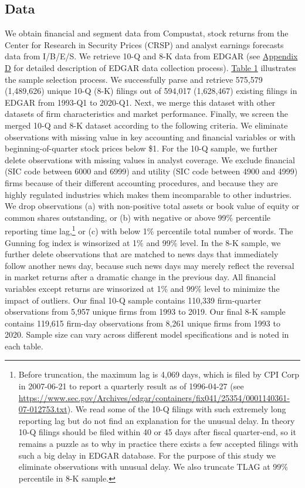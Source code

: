 \documentclass[letterpaper,12pt]{article}
\begin{document}
\begin{spacing}{1.5}
\subsection{Data}
\noindent We obtain financial and segment data from Compustat, stock returns from the Center for Research in Security Prices (CRSP) and analyst earnings forecasts data from I/B/E/S. We retrieve 10-Q and 8-K data from EDGAR (see \hyperref[appd]{Appendix D} for detailed description of EDGAR data collection process). \hyperref[T1]{Table 1} illustrates the sample selection process. We successfully parse and retrieve 575,579 (1,489,626) unique 10-Q (8-K) filings out of 594,017 (1,628,467) existing filings in EDGAR from 1993-Q1 to 2020-Q1. Next, we merge this dataset with other datasets of firm characteristics and market performance. Finally, we screen the merged 10-Q and 8-K dataset according to the following criteria. We eliminate observations with missing value in key accounting and financial variables or with beginning-of-quarter stock prices below \$1. For the 10-Q sample, we further delete observations with missing values in analyst coverage. We exclude financial (SIC code between 6000 and 6999) and utility (SIC code between 4900 and 4999) firms because of their different accounting procedures, and because they are highly regulated industries which makes them incomparable to other industries. We drop observations (a) with non-positive total assets or book value of equity or common shares outstanding, or (b) with negative or above 99\% percentile reporting time lag,\footnote{Before truncation, the maximum lag is 4,069 days, which is filed by CPI Corp in 2007-06-21 to report a quarterly result as of 1996-04-27 (see \url{https://www.sec.gov/Archives/edgar/containers/fix041/25354/0001140361-07-012753.txt}). We read some of the 10-Q filings with such extremely long reporting lag but do not find an explanation for the unusual delay. In theory 10-Q filings should be filed within 40 or 45 days after fiscal quarter-end, so it remains a puzzle as to why in practice there exists a few accepted filings with such a big delay in EDGAR database. For the purpose of this study we eliminate observations with unusual delay. We also truncate TLAG at 99\% percentile in 8-K sample.} or (c) with below 1\% percentile total number of words. The Gunning fog index is winsorized at 1\% and 99\% level. In the 8-K sample, we further delete observations that are matched to news days that immediately follow another news day, because such news days may merely reflect the reversal in market returns after a dramatic change in the previous day. All financial variables except returns are winsorized at 1\% and 99\% level to minimize the impact of outliers. Our final 10-Q sample contains 110,339 firm-quarter observations from 5,957 unique firms from 1993 to 2019. Our final 8-K sample contains 119,615 firm-day observations from 8,261 unique firms from 1993 to 2020. Sample size can vary across different model specifications and is noted in each table. 


\end{spacing}
\end{document}
